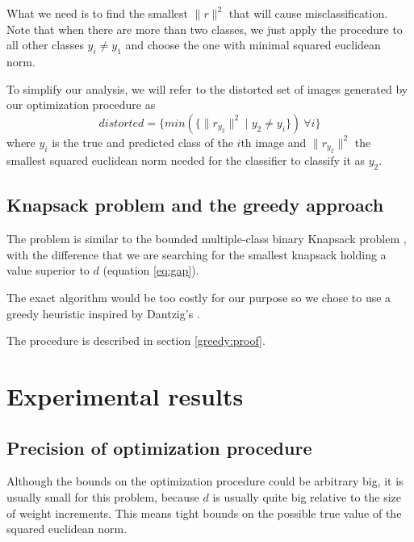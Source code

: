 \documentclass{article} %
\begin{document}
What we need is to find the smallest $ \lVert{r} \rVert^2$ that will cause
misclassification. Note that when there are more than two classes, we just
apply the procedure to all other classes $y_i \neq y_1$ and choose the one
with minimal squared euclidean norm.

To simplify our analysis, we will refer to the distorted set of images generated
by our optimization procedure as
\begin{equation}
	\label{robustness}
	distorted = \{min(\{\lVert{r_{y_2}} \rVert^2 \mid y_2 \neq y_i\})\ \forall i\}
\end{equation}
where $y_i$ is the true and predicted class of the $i$th image and $\lVert{r_{y_2}} \rVert^2$ the
smallest squared euclidean norm needed for the classifier to classify it as $y_2$.


\subsection{Knapsack problem and the greedy approach}

The problem is similar to the bounded multiple-class binary Knapsack problem
\citep{vanderbeck_extending_2002}, with the difference that we are searching
for the smallest knapsack holding a value superior to $d$ (equation
\ref{eq:gap}).

The exact algorithm would be too costly for our purpose so we chose to use a
greedy heuristic inspired by Dantzig's \citep{dantzig_discrete-variable_1957}.

The procedure is described in section \ref{greedy:proof}.



\section{Experimental results}




\subsection{Precision of optimization procedure}

Although the bounds on the optimization procedure could be arbitrary big, it
is usually small for this problem, because $d$ is usually quite big relative
to the size of weight increments. This means tight bounds on the possible
true value of the squared euclidean norm.
\end{document}

